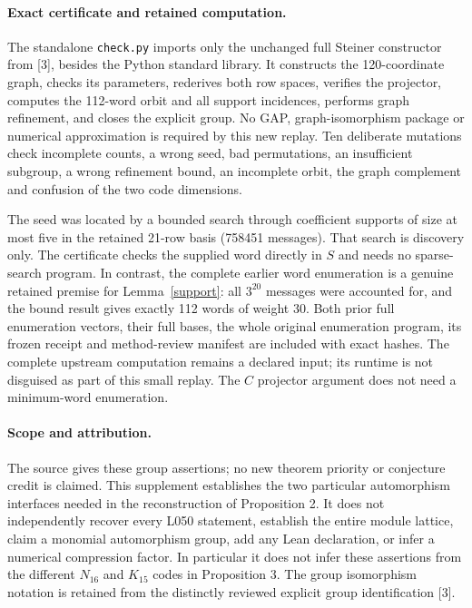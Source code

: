 \documentclass[11pt]{article}
\begin{document}
\paragraph{Exact certificate and retained computation.}
The standalone \texttt{check.py} imports only the unchanged full Steiner constructor from [3], besides the Python standard library. It constructs the 120-coordinate graph, checks its parameters, rederives both row spaces, verifies the projector, computes the 112-word orbit and all support incidences, performs graph refinement, and closes the explicit group. No GAP, graph-isomorphism package or numerical approximation is required by this new replay. Ten deliberate mutations check incomplete counts, a wrong seed, bad permutations, an insufficient subgroup, a wrong refinement bound, an incomplete orbit, the graph complement and confusion of the two code dimensions.

The seed was located by a bounded search through coefficient supports of size at most five in the retained 21-row basis (758451 messages). That search is discovery only. The certificate checks the supplied word directly in $S$ and needs no sparse-search program. In contrast, the complete earlier word enumeration is a genuine retained premise for Lemma~\ref{support}: all $3^{20}$ messages were accounted for, and the bound result gives exactly 112 words of weight 30. Both prior full enumeration vectors, their full bases, the whole original enumeration program, its frozen receipt and method-review manifest are included with exact hashes. The complete upstream computation remains a declared input; its runtime is not disguised as part of this small replay. The $C$ projector argument does not need a minimum-word enumeration.

\paragraph{Scope and attribution.}
The source gives these group assertions; no new theorem priority or conjecture credit is claimed. This supplement establishes the two particular automorphism interfaces needed in the reconstruction of Proposition 2. It does not independently recover every L050 statement, establish the entire module lattice, claim a monomial automorphism group, add any Lean declaration, or infer a numerical compression factor. In particular it does not infer these assertions from the different $N_{16}$ and $K_{15}$ codes in Proposition 3. The group isomorphism notation is retained from the distinctly reviewed explicit group identification [3].
\end{document}
